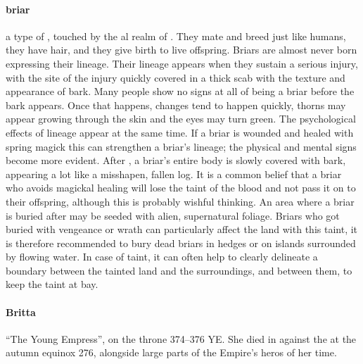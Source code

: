 \paragraph{briar} a type of , touched by the al realm of . They mate and breed just like humans, they have hair, and they give birth to live offspring. Briars are almost never born expressing their lineage. Their lineage appears when they sustain a serious injury, with the site of the injury quickly covered in a thick scab with the texture and appearance of bark. Many people show no signs at all of being a briar before the bark appears. Once that happens, changes tend to happen quickly, thorns may appear growing through the skin and the eyes may turn green. The psychological effects of lineage appear at the same time. If a briar is wounded and healed with spring magick this can strengthen a briar's lineage; the physical and mental signs become more evident. \localpar After , a briar’s entire body is slowly covered with bark, appearing a lot like a misshapen, fallen log. It is a common belief that a briar who avoids magickal healing will lose the taint of the blood and not pass it on to their offspring, although this is probably wishful thinking. An area where a briar is buried after  may be seeded with alien, supernatural foliage. Briars who got buried with vengeance or wrath can particularly affect the land with this taint, it is therefore recommended to bury dead briars in hedges or on islands surrounded by flowing water. In case of taint, it can often help to clearly delineate a boundary between the tainted land and the surroundings, and  between them, to keep the taint at bay.
\paragraph{Britta} “The Young Empress”, on the throne 374–376 YE. She died in  against the  at the autumn equinox 276, alongside large parts of the Empire's heros of her time.
